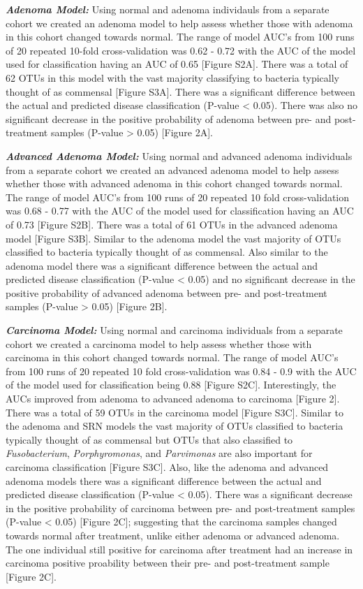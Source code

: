 \documentclass[12pt,]{article}
\begin{document}
\textbf{\emph{Adenoma Model:}} Using normal and adenoma individauls from
a separate cohort we created an adenoma model to help assess whether
those with adenoma in this cohort changed towards normal. The range of
model AUC's from 100 runs of 20 repeated 10-fold cross-validation was
0.62 - 0.72 with the AUC of the model used for classification having an
AUC of 0.65 {[}Figure S2A{]}. There was a total of 62 OTUs in this model
with the vast majority classifying to bacteria typically thought of as
commensal {[}Figure S3A{]}. There was a significant difference between
the actual and predicted disease classification (P-value \textless{}
0.05). There was also no significant decrease in the positive
probability of adenoma between pre- and post-treatment samples (P-value
\textgreater{} 0.05) {[}Figure 2A{]}.

\textbf{\emph{Advanced Adenoma Model:}} Using normal and advanced
adenoma individuals from a separate cohort we created an advanced
adenoma model to help assess whether those with advanced adenoma in this
cohort changed towards normal. The range of model AUC's from 100 runs of
20 repeated 10 fold cross-validation was 0.68 - 0.77 with the AUC of the
model used for classification having an AUC of 0.73 {[}Figure S2B{]}.
There was a total of 61 OTUs in the advanced adenoma model {[}Figure
S3B{]}. Similar to the adenoma model the vast majority of OTUs
classified to bacteria typically thought of as commensal. Also similar
to the adenoma model there was a significant difference between the
actual and predicted disease classification (P-value \textless{} 0.05)
and no significant decrease in the positive probability of advanced
adenoma between pre- and post-treatment samples (P-value \textgreater{}
0.05) {[}Figure 2B{]}.

\textbf{\emph{Carcinoma Model:}} Using normal and carcinoma individuals
from a separate cohort we created a carcinoma model to help assess
whether those with carcinoma in this cohort changed towards normal. The
range of model AUC's from 100 runs of 20 repeated 10 fold
cross-validation was 0.84 - 0.9 with the AUC of the model used for
classification being 0.88 {[}Figure S2C{]}. Interestingly, the AUCs
improved from adenoma to advanced adenoma to carcinoma {[}Figure 2{]}.
There was a total of 59 OTUs in the carcinoma model {[}Figure S3C{]}.
Similar to the adenoma and SRN models the vast majority of OTUs
classified to bacteria typically thought of as commensal but OTUs that
also classified to \emph{Fusobacterium}, \emph{Porphyromonas}, and
\emph{Parvimonas} are also important for carcinoma classification
{[}Figure S3C{]}. Also, like the adenoma and advanced adenoma models
there was a significant difference between the actual and predicted
disease classification (P-value \textless{} 0.05). There was a
significant decrease in the positive probability of carcinoma between
pre- and post-treatment samples (P-value \textless{} 0.05) {[}Figure
2C{]}; suggesting that the carcinoma samples changed towards normal
after treatment, unlike either adenoma or advanced adenoma. The one
individual still positive for carcinoma after treatment had an increase
in carcinoma positive proability between their pre- and post-treatment
sample {[}Figure 2C{]}.
\end{document}
